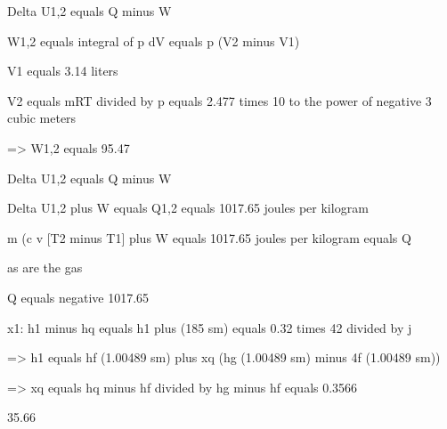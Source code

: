 Delta U1,2 equals Q minus W

W1,2 equals integral of p dV equals p (V2 minus V1)

V1 equals 3.14 liters

V2 equals mRT divided by p equals 2.477 times 10 to the power of negative 3 cubic meters

=> W1,2 equals 95.47

Delta U1,2 equals Q minus W

Delta U1,2 plus W equals Q1,2 equals 1017.65 joules per kilogram

m (c v [T2 minus T1] plus W equals 1017.65 joules per kilogram equals Q

as are the gas

Q equals negative 1017.65

x1: h1 minus hq equals h1 plus (185 sm) equals 0.32 times 42 divided by j

=> h1 equals hf (1.00489 sm) plus xq (hg (1.00489 sm) minus 4f (1.00489 sm))

=> xq equals hq minus hf divided by hg minus hf equals 0.3566

35.66%